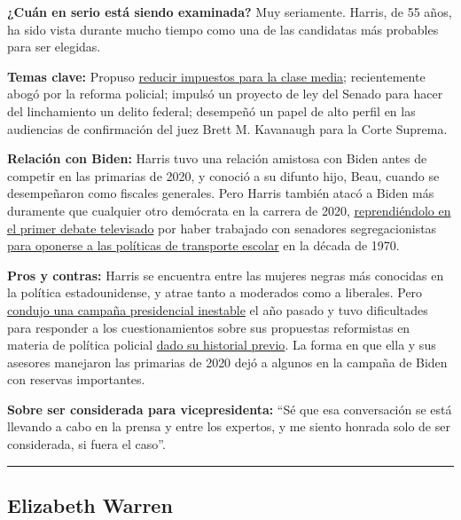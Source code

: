 \textbf{¿Cuán en serio está siendo examinada?} Muy seriamente. Harris,
de 55 años, ha sido vista durante mucho tiempo como una de las
candidatas más probables para ser elegidas.

\textbf{Temas clave:} Propuso
\href{https://www.nytimes.com/2019/05/01/us/politics/cory-booker-kamala-harris-2020.html}{reducir
impuestos para la clase media}; recientemente abogó por la reforma
policial; impulsó un proyecto de ley del Senado para hacer del
linchamiento un delito federal; desempeñó un papel de alto perfil en las
audiencias de confirmación del juez Brett M. Kavanaugh para la Corte
Suprema.

\textbf{Relación con Biden:} Harris tuvo una relación amistosa con Biden
antes de competir en las primarias de 2020, y conoció a su difunto hijo,
Beau, cuando se desempeñaron como fiscales generales. Pero Harris
también atacó a Biden más duramente que cualquier otro demócrata en la
carrera de 2020,
\href{https://www.nytimes.com/2019/07/31/us/politics/kamala-harris-biden-busing.html}{reprendiéndolo
en el primer debate televisado} por haber trabajado con senadores
segregacionistas
\href{https://www.nytimes.com/2019/07/15/us/politics/biden-busing.html?action=click\&module=RelatedLinks\&pgtype=Article}{para
oponerse a las políticas de transporte escolar} en la década de 1970.

\textbf{Pros y contras:} Harris se encuentra entre las mujeres negras
más conocidas en la política estadounidense, y atrae tanto a moderados
como a liberales. Pero
\href{https://www.nytimes.com/2019/11/29/us/politics/kamala-harris-2020.html}{condujo
una campaña presidencial inestable} el año pasado y tuvo dificultades
para responder a los cuestionamientos sobre sus propuestas reformistas
en materia de política policial
\href{https://www.nytimes.com/2019/09/09/us/politics/kamala-harris-criminal-justice.html}{dado
su historial previo}. La forma en que ella y sus asesores manejaron las
primarias de 2020 dejó a algunos en la campaña de Biden con reservas
importantes.

\textbf{Sobre ser considerada para vicepresidenta:} ``Sé que esa
conversación se está llevando a cabo en la prensa y entre los expertos,
y me siento honrada solo de ser considerada, si fuera el caso''.

\begin{center}\rule{0.5\linewidth}{\linethickness}\end{center}

\hypertarget{elizabeth-warren}{%
\subsection{Elizabeth Warren}\label{elizabeth-warren}}

